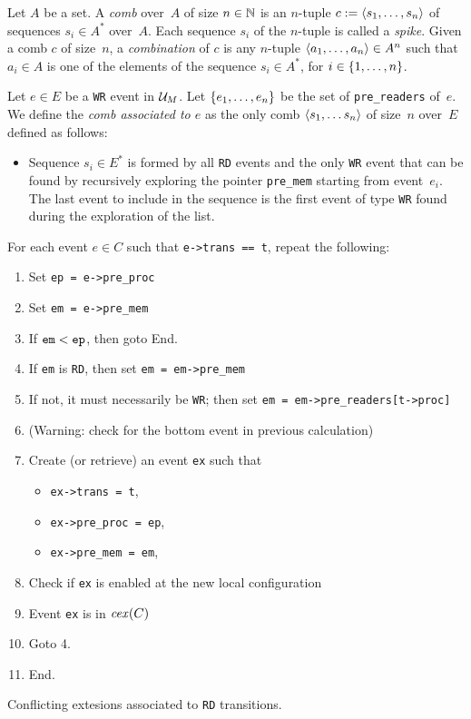 \documentclass{llncs}
\begin{document}
Let $A$ be a set.
A \emph{comb} over~$A$ of size $n \in \mathbb{N}$ is an $n$-tuple
$c \mathrel{:=} \langle s_1, \ldots, s_n\rangle$ of sequences $s_i \in A^*$
over~$A$.
Each sequence $s_i$ of the $n$-tuple is called a \emph{spike}.
Given a comb $c$ of size~$n$,
a \emph{combination} of $c$ is any $n$-tuple $\langle a_1, \ldots, a_n\rangle \in A^n$
such that $a_i \in A$ is one of the elements of the sequence $s_i \in A^*$, for
$i \in {\{ 1, \ldots, n \mathclose \}}$.

Let $e \in E$ be a \verb!WR! event in $\mathcal{U}_{M}$.
Let ${\{ e_1, \ldots, e_n \mathclose \}}$ be the set of \verb!pre_readers! of~$e$.
We define the \emph{comb associated to $e$} as the only comb
$\langle s_1, \ldots s_n\rangle$ of size~$n$ over~$E$ defined as follows:
\begin{itemize}
\item
  Sequence $s_i \in E^*$ is formed by all \verb!RD! events and the only
  \verb!WR! event that can be found by recursively exploring the pointer
  \verb!pre_mem! starting from event~$e_i$. The last event to include in the
  sequence is the first event of type \verb!WR! found during the exploration of
  the list.
\end{itemize}


\begin{algorithm}
\noindent
For each event $e \in C$ such that \verb!e->trans == t!, repeat the following:
\begin{enumerate}
\item Set \verb!ep = e->pre_proc!
\item Set \verb!em = e->pre_mem!
\item If $\verb!em! < \verb!ep!$, then goto End.
\item If \verb!em! is \verb!RD!, then set \verb!em = em->pre_mem!
\item If not, it must necessarily be \verb!WR!; then set \verb!em = em->pre_readers[t->proc]!
\item (Warning: check for the bottom event in previous calculation)
\item
  Create (or retrieve) an event \verb!ex! such that
  \begin{itemize}
  \item \verb!ex->trans = t!,
  \item \verb!ex->pre_proc = ep!,
  \item \verb!ex->pre_mem = em!,
  \end{itemize}
  
\item Check if \verb!ex! is enabled at the new local configuration
\item Event \verb!ex! is in $\mathop{\mathit{cex}} (C)$
\item Goto 4.
\item End.
\end{enumerate}
\caption{Conflicting extesions associated to \texttt{RD} transitions.}
\label{a:cex_rd}
\end{algorithm}
\end{document}
